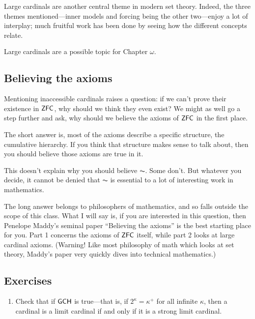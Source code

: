 \documentclass[10pt]{amsart}
\begin{document}
Large cardinals are another central theme in modern set theory. Indeed, the three themes mentioned---inner models and forcing being the other two---enjoy a lot of interplay; much fruitful work has been done by seeing how the different concepts relate.

Large cardinals are a possible topic for Chapter $\omega$.

\subsection*{Believing the axioms}

Mentioning inaccessible cardinals raises a question: if we can't prove their existence in $\mathsf{ZFC}$, why should we think they even exist? We might as well go a step further and ask, why should we believe the axioms of $\mathsf{ZFC}$ in the first place.

The short answer is, most of the axioms describe a specific structure, the cumulative hierarchy. If you think that structure makes sense to talk about, then you should believe those axioms are true in it.

This doesn't explain why you should believe $\AC$. Some don't. But whatever you decide, it cannot be denied that $\AC$ is essential to a lot of interesting work in mathematics.

The long answer belongs to philosophers of mathematics, and so falls outside the scope of this class. What I will say is, if you are interested in this question, then Penelope Maddy's seminal paper ``Believing the axioms'' is the best starting place for you. Part 1 concerns the axioms of $\mathsf{ZFC}$ itself, while part 2 looks at large cardinal axioms. (Warning! Like most philosophy of math which looks at set theory, Maddy's paper very quickly dives into technical mathematics.)

\subsection*{Exercises}

\begin{enumerate}
\item Check that if $\mathsf{GCH}$ is true---that is, if $2^\kappa = \kappa^+$ for all infinite $\kappa$, then a cardinal is a limit cardinal if and only if it is a strong limit cardinal.
\end{enumerate}
\end{document}
